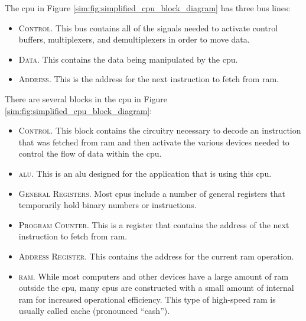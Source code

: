 \begin{figure}[H]
\end{figure}

The \gls{cpu} in Figure \ref{sim:fig:simplified_cpu_block_diagram} has three bus lines: 

\begin{itemize}
  \item \textsc{Control}. This bus contains all of the signals needed to activate control buffers, multiplexers, and demultiplexers in order to move data.
  \item \textsc{Data}. This contains the data being manipulated by the \gls{cpu}.
  \item \textsc{Address}. This is the address for the next instruction to fetch from \gls{ram}.
\end{itemize}

There are several blocks in the \gls{cpu} in Figure \ref{sim:fig:simplified_cpu_block_diagram}:

\begin{itemize}
  \item \textsc{Control}. This block contains the circuitry necessary to decode an instruction that was fetched from \gls{ram} and then activate the various devices needed to control the flow of data within the \gls{cpu}.
  \item \textsc{\gls{alu}}. This is an \gls{alu} designed for the application that is using this \gls{cpu}.
  \item \textsc{General Registers}. Most \glspl{cpu} include a number of general registers that temporarily hold binary numbers or instructions.
  \item \textsc{Program Counter}. This is a register that contains the address of the next instruction to fetch from \gls{ram}.
  \item \textsc{Address Register}. This contains the address for the current \gls{ram} operation.
  \item \textsc{\gls{ram}}. While most computers and other devices have a large amount of \gls{ram} outside the \gls{cpu}, many \glspl{cpu} are constructed with a small amount of internal \gls{ram} for increased operational efficiency. This type of high-speed \gls{ram} is usually called cache (pronounced ``cash'').
\end{itemize}

